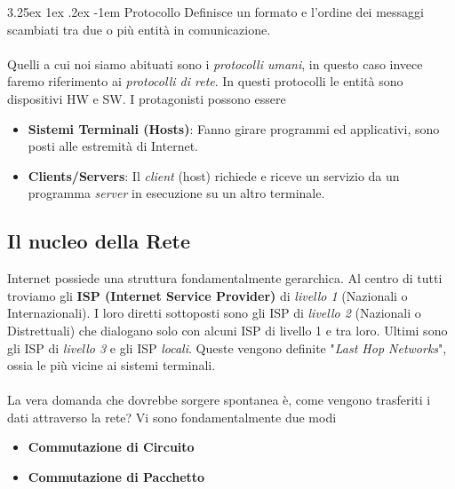 \documentclass{article}
\makeatletter
\renewcommand\paragraph{\@startsection{paragraph}{5}{\z@}%
  {3.25ex \@plus1ex \@minus.2ex}%
  {-1em}%
  {\normalfont\normalsize\bfseries}}
\makeatother
\begin{document}
        \paragraph{Protocollo} Definisce un formato e l'ordine dei messaggi scambiati tra due o più entità in comunicazione.\\
        \\
        Quelli a cui noi siamo abituati sono i \textit{protocolli umani}, in questo caso invece faremo riferimento ai \textit{protocolli di rete}. In questi protocolli le entità sono dispositivi HW e SW.
        I protagonisti possono essere
        \begin{itemize}
            \item \textbf{Sistemi Terminali (Hosts)}: Fanno girare programmi ed applicativi, sono posti alle estremità di Internet.
            \item \textbf{Clients/Servers}: Il \textit{client} (host) richiede e riceve un servizio da un programma \textit{server} in esecuzione su un altro terminale.
        \end{itemize}

        \subsection{Il nucleo della Rete}
            Internet possiede una struttura fondamentalmente gerarchica. Al centro di tutti troviamo gli \textbf{ISP (Internet Service Provider)} di \textit{livello 1} (Nazionali o Internazionali). I loro diretti sottoposti sono gli ISP di \textit{livello 2} (Nazionali o Distrettuali) che dialogano solo con alcuni ISP di livello 1 e tra loro. Ultimi sono gli ISP di \textit{livello 3} e gli ISP \textit{locali}. Queste vengono definite "\textit{Last Hop Networks}", ossia le più vicine ai sistemi terminali.\\
            \\
            La vera domanda che dovrebbe sorgere spontanea è, come vengono trasferiti i dati attraverso la rete? Vi sono fondamentalmente due modi
            \begin{itemize}
                \item \textbf{Commutazione di Circuito}
                \item \textbf{Commutazione di Pacchetto}
            \end{itemize}
\end{document}
